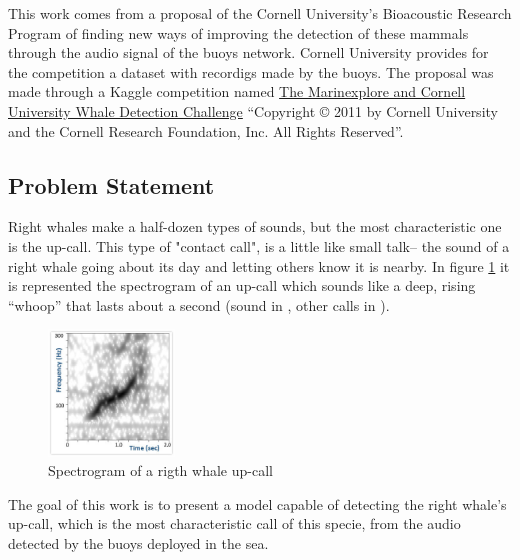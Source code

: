 \documentclass[]{article}
\newcommand{\competition}{The Marinexplore and Cornell University Whale Detection Challenge}
\newcommand{\copyrighting}{“Copyright © 2011 by Cornell University and the Cornell Research Foundation, Inc. All Rights Reserved”}
\begin{document}
This work comes from a proposal of the Cornell University's Bioacoustic Research Program of finding new ways of improving the detection of these mammals through the audio signal of the buoys network.  Cornell University provides for the competition a dataset with recordigs made by the buoys. The proposal was made through a Kaggle competition named \href{https://www.kaggle.com/c/whale-detection-challenge}{\competition} \cite{kagglewhale} \copyrighting.

\subsection{Problem Statement}\label{problem-statement}

Right whales make a half-dozen types of sounds, but the most characteristic one is the up-call. This type of "contact call",  is a little like small talk-- the sound of a right whale going about its day and letting others know it is nearby. In figure \ref{img:upcall} it is represented the spectrogram of an up-call which sounds like a deep, rising “whoop” that lasts about a second (sound in \cite{CornellWeb}, other calls in \cite{CornellWeb2}).

\begin{figure}[htpb!]
\centering
\includegraphics[width= 0.3\textwidth]{images/sound_upcall_quiet.jpg}
\caption{Spectrogram of a rigth whale up-call \cite{CornellWeb} \label{img:upcall}}
\end{figure}
The goal of this work is to present a model capable of detecting the right whale's up-call, which is the most characteristic call of this specie, from the audio detected by the buoys deployed in the sea.
\end{document}

